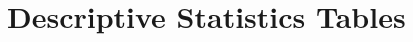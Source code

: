 \documentclass[11pt]{article}
\begin{document}
\section*{Descriptive Statistics Tables}

\clearpage

\end{document}
